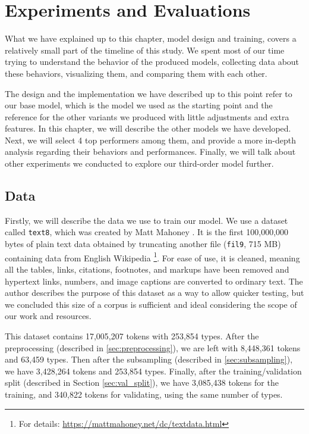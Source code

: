 
\chapter{Experiments and Evaluations}
\label{chp:experiments}

What we have explained up to this chapter, model design and training, covers a relatively small part of the timeline of this study. We spent most of our time trying to understand the behavior of the produced models, collecting data about these behaviors, visualizing them, and comparing them with each other. 

The design and the implementation we have described up to this point refer to our base model, which is the model we used as the starting point and the reference for the other variants we produced with little adjustments and extra features. In this chapter, we will describe the other models we have developed. Next, we will select 4 top performers among them, and provide a more in-depth analysis regarding their behaviors and performances. Finally, we will talk about other experiments we conducted to explore our third-order model further.

\section{Data}
\label{sec:train_data}

Firstly, we will describe the data we use to train our model. We use a dataset called \verb|text8|, which was created by Matt Mahoney \cite{text8}. It is the first 100,000,000 bytes of plain text data obtained by truncating another file (\verb|fil9|, 715 MB) containing data from English Wikipedia \footnote{For details: \url{https://mattmahoney.net/dc/textdata.html}}. For ease of use, it is cleaned, meaning all the tables, links, citations, footnotes, and markups have been removed and hypertext links, numbers, and image captions are converted to ordinary text. The author describes the purpose of this dataset as a way to allow quicker testing, but we concluded this size of a corpus is sufficient and ideal considering the scope of our work and resources.

This dataset contains 17,005,207 tokens with 253,854 types. After the preprocessing (described in \ref{sec:preprocessing}), we are left with 8,448,361 tokens and 63,459 types. Then after the subsampling (described in \ref{sec:subsampling}), we have 3,428,264 tokens and 253,854 types. Finally, after the training/validation split (described in Section \ref{sec:val_split}), we have 3,085,438 tokens for the training, and 340,822 tokens for validating, using the same number of types.

